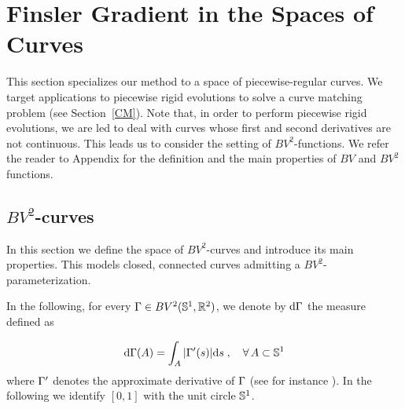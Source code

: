 \section{Finsler Gradient in the Spaces of Curves}\label{SC}

This section specializes our method to a space of piecewise-regular curves. We target applications to piecewise rigid evolutions to solve a curve matching problem (see Section~\ref{CM}). Note that, in order to perform piecewise rigid evolutions, we are led to deal with curves whose first and second derivatives are not continuous. This leads us to consider  the setting of $BV^2$-functions. We refer the reader to Appendix  for the definition and the main properties of $BV$ and $BV^2$ functions.  



\subsection{$BV^2$-curves}

In this section we define the space of $BV^2$-curves and introduce its main properties. This models closed, connected curves admitting a  $BV^2$-parameterization.
\par In the following, for every $\Gamma\in BV^2(\mathbb{S}^1, \mathbb{R}^2)$, we denote by  $\mathrm{d}\Gamma$ the measure defined as 

$$
\mathrm{d} \Gamma(A)=\int_A |\Gamma'(s)| \mathrm{d} s \;, \quad \forall \, A\subset \mathbb{S}^1
$$
where $\Gamma'$ denotes the approximate derivative of $\Gamma$ (see for instance \cite{AFP}). In the following we identify $[0,1]$ with the unit circle $\mathbb{S}^1$.


